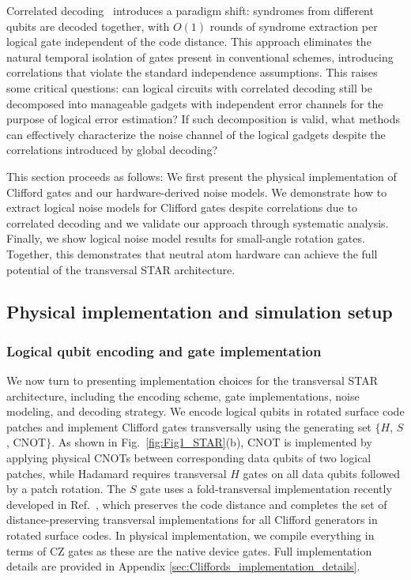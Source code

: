 \documentclass[aps, prx, reprint, superscriptaddress, longbibliography, floatfix]{revtex4-2}
\begin{document}
Correlated decoding~\cite{Cain2025, Cain2025b} introduces a paradigm shift: syndromes from different qubits are decoded together, with $O(1)$ rounds of syndrome extraction per logical gate independent of the code distance. This approach eliminates the natural temporal isolation of gates present in conventional schemes, introducing correlations that violate the standard independence assumptions. This raises some critical questions: can logical circuits with correlated decoding still be decomposed into manageable gadgets with independent error channels for the purpose of logical error estimation? If such decomposition is valid, what methods can effectively characterize the noise channel of the logical gadgets despite the correlations introduced by global decoding?

This section proceeds as follows: We first present the physical implementation of Clifford gates and our hardware-derived noise models. We demonstrate how to extract logical noise models for Clifford gates despite correlations due to correlated decoding and we validate our approach through systematic analysis. Finally, we show logical noise model results for small-angle rotation gates. Together, this demonstrates that neutral atom hardware can achieve the full potential of the transversal STAR architecture.

\subsection{Physical implementation and simulation setup}
\label{sec:implementation_overview}
\subsubsection{Logical qubit encoding and gate implementation}

We now turn to presenting implementation choices for the transversal STAR architecture, including the encoding scheme, gate implementations, noise modeling, and decoding strategy. We encode logical qubits in rotated surface code patches and implement Clifford gates transversally using the generating set $\{H$, $S$, CNOT$\}$. As shown in Fig.~\ref{fig:Fig1_STAR}(b), CNOT is implemented by applying physical CNOTs between corresponding data qubits of two logical patches, while Hadamard requires transversal $H$ gates on all data qubits followed by a patch rotation. The $S$ gate uses a fold-transversal implementation recently developed in Ref.~\cite{Chen2024}, which preserves the code distance and completes the set of distance-preserving transversal implementations for all Clifford generators in rotated surface codes. In physical implementation, we compile everything in terms of CZ gates as these are the native device gates. Full implementation details are provided in Appendix \ref{sec:Cliffords_implementation_details}.
\end{document}
